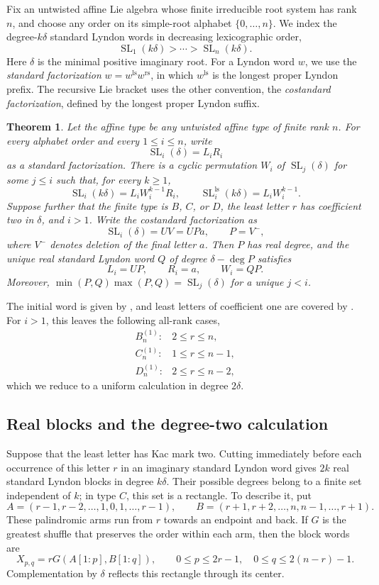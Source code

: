 \documentclass[11pt]{amsart}
\numberwithin{equation}{section}
\newtheorem{theorem}{Theorem}[section]
\theoremstyle{definition}
\DeclareMathOperator{\SL}{SL}
\newcommand{\ls}{\mathrm{ls}}
\newcommand{\rs}{\mathrm{rs}}
\begin{document}
Fix an untwisted affine Lie algebra whose finite irreducible root system has rank $n$, and choose any order on its simple-root alphabet $\{0,\ldots,n\}$. We index the degree-$k\delta$ standard Lyndon words in decreasing lexicographic order,
\[
 \SL_1(k\delta)>\cdots>\SL_n(k\delta).
\]
Here $\delta$ is the minimal positive imaginary root. For a Lyndon word $w$, we use the \emph{standard factorization} $w=w^{\ls}w^{\rs}$, in which $w^{\ls}$ is the longest proper Lyndon prefix. The recursive Lie bracket uses the other convention, the \emph{costandard factorization}, defined by the longest proper Lyndon suffix.

\begin{theorem}\label{thm:main}
Let the affine type be any untwisted affine type of finite rank $n$. For every alphabet order and every $1\leq i\leq n$, write
\[
 \SL_i(\delta)=L_iR_i
\]
as a standard factorization. There is a cyclic permutation $W_i$ of $\SL_j(\delta)$ for some $j\leq i$ such that, for every $k\geq1$,
\begin{equation}\label{eq:main}
 \SL_i(k\delta)=L_iW_i^{k-1}R_i,
 \qquad
 \SL_i^{\ls}(k\delta)=L_iW_i^{k-1}.
\end{equation}
Suppose further that the finite type is $B$, $C$, or $D$, the least letter $r$ has coefficient two in $\delta$, and $i>1$. Write the costandard factorization as
\[
 \SL_i(\delta)=UV=UPa,
 \qquad P=V^{-},
\]
where $V^{-}$ denotes deletion of the final letter $a$. Then $P$ has real degree, and the unique real standard Lyndon word $Q$ of degree $\delta-\deg P$ satisfies
\[
 L_i=UP,\qquad R_i=a,\qquad W_i=QP.
\]
Moreover, $\min(P,Q)\max(P,Q)=\SL_j(\delta)$ for a unique $j<i$.
\end{theorem}

The initial word is given by \cite[Proposition~6.25]{ET}, and least letters of coefficient one are covered by \cite[Theorem~6.14]{ET}. For $i>1$, this leaves the following all-rank cases,
\[
 \begin{array}{ll}
 B_n^{(1)}:&2\leq r\leq n,\\
 C_n^{(1)}:&1\leq r\leq n-1,\\
 D_n^{(1)}:&2\leq r\leq n-2,
 \end{array}
\]
which we reduce to a uniform calculation in degree $2\delta$.

\subsection{Real blocks and the degree-two calculation}
Suppose that the least letter has Kac mark two. Cutting immediately before each occurrence of this letter $r$ in an imaginary standard Lyndon word gives $2k$ real standard Lyndon blocks in degree $k\delta$. Their possible degrees belong to a finite set independent of $k$; in type $C$, this set is a rectangle. To describe it, put
\[
 A=(r-1,r-2,\ldots,1,0,1,\ldots,r-1),
 \qquad
 B=(r+1,r+2,\ldots,n,n-1,\ldots,r+1).
\]
These palindromic arms run from $r$ towards an endpoint and back. If $G$ is the greatest shuffle that preserves the order within each arm, then the block words are
\[
 X_{p,q}=rG(A[1:p],B[1:q]),
 \qquad 0\leq p\leq2r-1,\quad 0\leq q\leq2(n-r)-1.
\]
Complementation by $\delta$ reflects this rectangle through its center.
\end{document}
